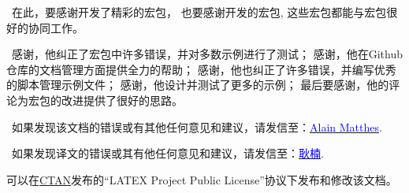 \documentclass[DIV         = 14,
               fontsize    = 10,
               headinclude = false,
               index       = totoc,
               footinclude = false,
               twoside,
               headings    = small
               ]{tkz-doc-zh}
\begin{document}
\presentation

\vspace*{24pt}

\noindent\lefthand\ 在此，要感谢开发了精彩的\tkzname{\TIKZ}宏包，
也要感谢开发的宏包, 
这些宏包都能与宏包很好的协同工作。


\vspace*{12pt}

\noindent\lefthand\ 感谢，他纠正了宏包中许多错误，并对多数示例进行了测试；
感谢，他在Github仓库的文档管理方面提供全力的帮助；
感谢，他也纠正了许多错误，并编写优秀的脚本管理示例文件；
感谢，他设计并测试了更多的示例；
最后要感谢，他的评论为宏包的改进提供了很好的思路。


\vfill
\noindent\lefthand\ 如果发现该文档的错误或有其他任何意见和建议，请发信至：\href{mailto:al.ma@mac.com}{\textcolor{blue}{Alain Matthes}}.

\noindent\lefthand\ 如果发现译文的错误或其有他任何意见和建议，请发信至：\href{mailto:nangeng@nwafu.edu.cn}{\textcolor{blue}{耿楠}}.

可以在\href{http://www.ctan.org/}{CTAN}发布的``LATEX Project Public
License''协议下发布和修改该文档。
\end{document}
